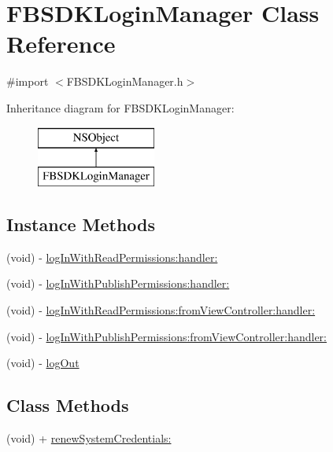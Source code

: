 \hypertarget{interface_f_b_s_d_k_login_manager}{}\section{F\+B\+S\+D\+K\+Login\+Manager Class Reference}
\label{interface_f_b_s_d_k_login_manager}


{\ttfamily \#import $<$F\+B\+S\+D\+K\+Login\+Manager.\+h$>$}

Inheritance diagram for F\+B\+S\+D\+K\+Login\+Manager\+:\begin{figure}[H]
\begin{center}
\leavevmode
\includegraphics[height=2.000000cm]{interface_f_b_s_d_k_login_manager}
\end{center}
\end{figure}
\subsection*{Instance Methods}
\begin{DoxyCompactItemize}
\item 
(void) -\/ \hyperlink{interface_f_b_s_d_k_login_manager_aabd1b048ff206a12a6f542c5ba3f2dec}{log\+In\+With\+Read\+Permissions\+:handler\+:}
\item 
(void) -\/ \hyperlink{interface_f_b_s_d_k_login_manager_ab710e08f5bd34bd35190c3bc580e11fd}{log\+In\+With\+Publish\+Permissions\+:handler\+:}
\item 
(void) -\/ \hyperlink{interface_f_b_s_d_k_login_manager_a36e2410b4ad051ba98837c5af90bda6f}{log\+In\+With\+Read\+Permissions\+:from\+View\+Controller\+:handler\+:}
\item 
(void) -\/ \hyperlink{interface_f_b_s_d_k_login_manager_a976326a3af4e52782f1e23a050321636}{log\+In\+With\+Publish\+Permissions\+:from\+View\+Controller\+:handler\+:}
\item 
(void) -\/ \hyperlink{interface_f_b_s_d_k_login_manager_a4fa13ba37d31c17cc1f1f1f32d309bec}{log\+Out}
\end{DoxyCompactItemize}
\subsection*{Class Methods}
\begin{DoxyCompactItemize}
\item 
(void) + \hyperlink{interface_f_b_s_d_k_login_manager_af200973975f71cc6c74926f5f3f4aac6}{renew\+System\+Credentials\+:}
\end{DoxyCompactItemize}
